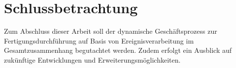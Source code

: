 \chapter{Schlussbetrachtung}\label{ch:Ende}
Zum Abschluss dieser Arbeit soll der dynamische Geschäftsprozess zur Fertigungsdurchführung auf Basis von Ereignisverarbeitung im Gesamtzusammenhang begutachtet werden.
Zudem erfolgt ein Ausblick auf zukünftige Entwicklungen und Erweiterungsmöglichkeiten.


